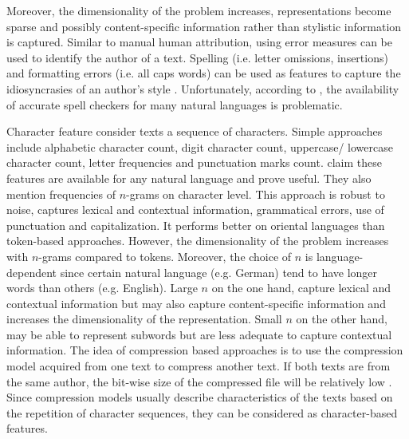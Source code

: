 Moreover, the dimensionality of the problem increases, representations become sparse and possibly content-specific information rather than stylistic information is captured.
Similar to manual human attribution, using error measures can be used to identify the author of a text.
Spelling (i.e. letter omissions, insertions) and formatting errors (i.e. all caps words) can be used as features 
to capture the idiosyncrasies of an author's style \citep{elmanarelbouanani_authorship_2014,bevendorff_overview_2024}.
Unfortunately, according to \citep{stamatatos_survey_2009}, the availability of accurate spell checkers for many natural languages is problematic.


Character feature consider texts a sequence of characters.
Simple approaches include alphabetic character count, digit character count, uppercase/ lowercase character count, letter frequencies and punctuation marks count.
\citet{stamatatos_survey_2009} claim these features are available for any natural language and prove useful.
They also mention frequencies of $n$-grams on character level.
This approach is robust to noise, captures lexical and contextual information, grammatical errors, use of punctuation and capitalization.
It performs better on oriental languages than token-based approaches.
However, the dimensionality of the problem increases with $n$-grams compared to tokens.
Moreover, the choice of $n$ is language-dependent since certain natural language (e.g. German) tend to have longer words than others (e.g. English).
Large $n$ on the one hand, capture lexical and contextual information but may also capture content-specific information and increases the dimensionality of the representation.
Small $n$ on the other hand, may be able to represent subwords but are less adequate to capture contextual information.
The idea of compression based approaches is to use the compression model acquired from one text to compress another text. 
If both texts are from the same author, the bit-wise size of the compressed file will be relatively low \citep{stamatatos_survey_2009,neal_surveying_2018}.
Since compression models usually describe characteristics of the texts based on the repetition of character sequences, 
they can be considered as character-based features. 



